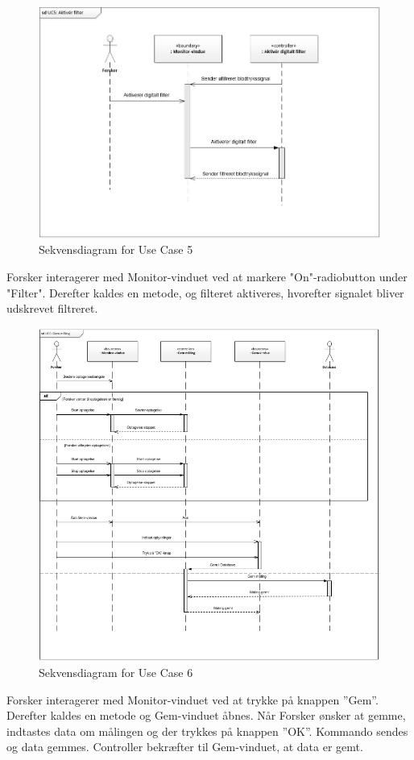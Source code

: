 \begin{figure}[H]
	\centering
	\includegraphics[width=1\textwidth]{Figurer/UC5_SD}
	\caption{Sekvensdiagram for Use Case 5}
\end{figure}

Forsker interagerer med Monitor-vinduet ved at markere "On"\--radiobutton under "Filter". Derefter kaldes en metode, og filteret aktiveres, hvorefter signalet bliver udskrevet filtreret.

\begin{figure}[H]
	\centering
	\includegraphics[width=1\textwidth]{Figurer/UC6_SD}
	\caption{Sekvensdiagram for Use Case 6}
\end{figure}

Forsker interagerer med Monitor-vinduet ved at trykke på knappen ”Gem”. Derefter kaldes en metode og Gem-vinduet åbnes. Når Forsker ønsker at gemme, indtastes data om målingen og der trykkes på knappen ”OK”. Kommando sendes og data gemmes. Controller bekræfter til Gem-vinduet, at data er gemt.
